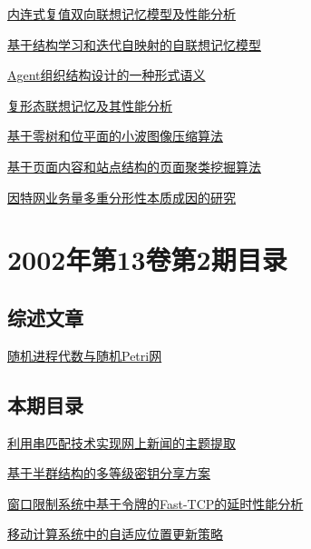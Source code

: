 \documentclass[a4paper]{article}
\begin{document}
\href{http://www.jos.org.cn/ch/reader/download_pdf.aspx?file_no=20020316&year_id=2002&quarter_id=3&falg=1}{内连式复值双向联想记忆模型及性能分析}

\href{http://www.jos.org.cn/ch/reader/download_pdf.aspx?file_no=20020317&year_id=2002&quarter_id=3&falg=1}{基于结构学习和迭代自映射的自联想记忆模型}

\href{http://www.jos.org.cn/ch/reader/download_pdf.aspx?file_no=20020318&year_id=2002&quarter_id=3&falg=1}{Agent组织结构设计的一种形式语义}

\href{http://www.jos.org.cn/ch/reader/download_pdf.aspx?file_no=20020319&year_id=2002&quarter_id=3&falg=1}{复形态联想记忆及其性能分析}

\href{http://www.jos.org.cn/ch/reader/download_pdf.aspx?file_no=20020320&year_id=2002&quarter_id=3&falg=1}{基于零树和位平面的小波图像压缩算法}

\href{http://www.jos.org.cn/ch/reader/download_pdf.aspx?file_no=20020321&year_id=2002&quarter_id=3&falg=1}{基于页面内容和站点结构的页面聚类挖掘算法}

\href{http://www.jos.org.cn/ch/reader/download_pdf.aspx?file_no=20020322&year_id=2002&quarter_id=3&falg=1}{因特网业务量多重分形性本质成因的研究}


\section{\textbf{2002年第13卷第2期目录}}
\subsection{综述文章}
\href{http://www.jos.org.cn/ch/reader/download_pdf.aspx?file_no=20020206&year_id=2002&quarter_id=2&falg=1}{随机进程代数与随机Petri网}

\subsection{本期目录}
\href{http://www.jos.org.cn/ch/reader/download_pdf.aspx?file_no=20020201&year_id=2002&quarter_id=2&falg=1}{利用串匹配技术实现网上新闻的主题提取}

\href{http://www.jos.org.cn/ch/reader/download_pdf.aspx?file_no=20020202&year_id=2002&quarter_id=2&falg=1}{基于半群结构的多等级密钥分享方案}

\href{http://www.jos.org.cn/ch/reader/download_pdf.aspx?file_no=20020203&year_id=2002&quarter_id=2&falg=1}{窗口限制系统中基于令牌的Fast-TCP的延时性能分析}

\href{http://www.jos.org.cn/ch/reader/download_pdf.aspx?file_no=20020204&year_id=2002&quarter_id=2&falg=1}{移动计算系统中的自适应位置更新策略}
\end{document}
